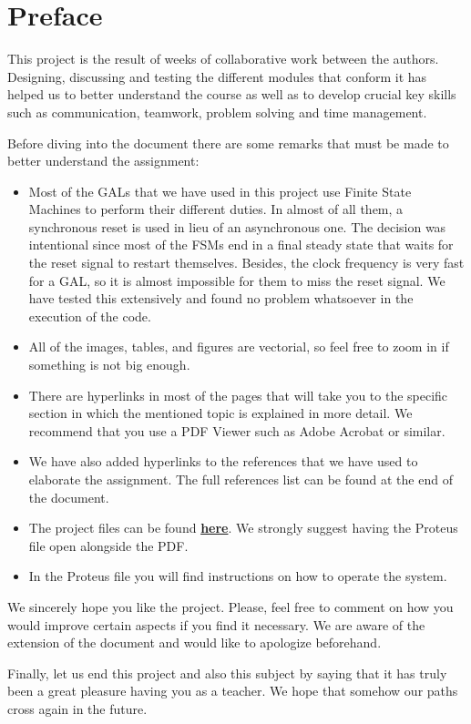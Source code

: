 \section*{Preface}
\thispagestyle{empty}
\setcounter{page}{0}

This project is the result of weeks of collaborative work between the authors. Designing, discussing and testing the different modules that conform it has helped us to better understand the course as well as to develop crucial key skills such as communication, teamwork, problem solving and time management. \medskip 

Before diving into the document there are some remarks that must be made to better understand the assignment:

\begin{itemize}
    \item Most of the GALs that we have used in this project use Finite State Machines to perform their different duties. In almost of all them, a synchronous reset is used in lieu of an asynchronous one. The decision was intentional since most of the FSMs end in a final steady state that waits for the reset signal to restart themselves. Besides, the clock frequency is very fast for a GAL, so it is almost impossible for them to miss the reset signal. We have tested this extensively and found no problem whatsoever in the execution of the code.
    
    \item All of the images, tables, and figures are vectorial, so feel free to zoom in if something is not big enough.
    
    \item There are hyperlinks in most of the pages that will take you to the specific section in which the mentioned topic is explained in more detail. We recommend that you use a PDF Viewer such as Adobe Acrobat or similar.
    
    \item We have also added hyperlinks to the references that we have used to elaborate the assignment. The full references list can be found at the end of the document.
    
    \item The project files can be found \textbf{\href{https://drive.google.com/drive/folders/1CNiwcC9CncEdfxiFuib3KTSMWgVY08vC?usp=sharing}{here}}. We strongly suggest having the Proteus file open alongside the PDF.
    
    \item In the Proteus file you will find instructions on how to operate the system.
\end{itemize}

\medskip

We sincerely hope you like the project. Please, feel free to comment on how you would improve certain aspects if you find it necessary. We are aware of the extension of the document and would like to apologize beforehand.\bigskip 

Finally, let us end this project and also this subject by saying that it has truly been a great pleasure having you as a teacher. We hope that somehow our paths cross again in the future. 


\clearpage